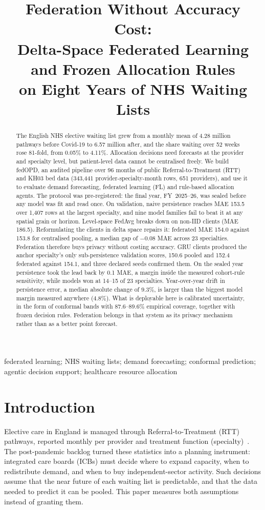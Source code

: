 \documentclass[conference]{IEEEtran}
\title{Federation Without Accuracy Cost:\\
Delta-Space Federated Learning and Frozen Allocation Rules\\
on Eight Years of NHS Waiting Lists}
\author{\IEEEauthorblockN{Nilesh Sarkar}
\IEEEauthorblockA{nileshsarkar.cs@gmail.com\\
Code, data pipeline and all stored outputs: \url{https://github.com/nileshsarkar-ai/fedOPD}}}
\begin{document}
\maketitle

\begin{abstract}
The English NHS elective waiting list grew from a monthly mean of 4.28 million pathways before
Covid-19 to 6.57 million after, and the share waiting over 52 weeks rose 81-fold, from 0.05\% to
4.11\%. Allocation decisions need forecasts at the provider and specialty level, but patient-level
data cannot be centralised freely. We build fedOPD, an audited pipeline over 96 months of public
Referral-to-Treatment (RTT) and KH03 bed data (343{,}441 provider-specialty-month rows, 651
providers), and use it to evaluate demand forecasting, federated learning (FL) and rule-based
allocation agents. The protocol was pre-registered: the final year, FY~2025--26, was sealed before
any model was fit and read once. On validation, naive persistence reaches MAE 153.5 over 1{,}407
rows at the largest specialty, and nine model families fail to beat it at any spatial grain or
horizon. Level-space FedAvg breaks down on non-IID clients (MAE 186.5). Reformulating the clients
in delta space repairs it: federated MAE 154.0 against 153.8 for centralised pooling, a median gap
of $-0.08$ MAE across 23 specialties. Federation therefore buys privacy without costing accuracy.
GRU clients produced the anchor specialty's only sub-persistence validation scores, 150.6 pooled
and 152.4 federated against 154.1, and three declared seeds confirmed them. On the sealed year
persistence took the lead back by 0.1 MAE, a margin inside the measured cohort-rule sensitivity,
while models won at 14--15 of 23 specialties. Year-over-year drift in persistence error, a median
absolute change of $9.3\%$, is larger than the biggest model margin measured anywhere ($4.8\%$).
What is deployable here is calibrated uncertainty, in the form of conformal bands with
87.6--89.6\% empirical coverage, together with frozen decision rules. Federation belongs in that
system as its privacy mechanism rather than as a better point forecast.
\end{abstract}

\begin{IEEEkeywords}
federated learning; NHS waiting lists; demand forecasting; conformal prediction; agentic decision
support; healthcare resource allocation
\end{IEEEkeywords}

\section{Introduction}
Elective care in England is managed through Referral-to-Treatment (RTT) pathways, reported monthly
per provider and treatment function (specialty)~\cite{nhsrtt}. The post-pandemic backlog turned
these statistics into a planning instrument: integrated care boards (ICBs) must decide where to
expand capacity, when to redistribute demand, and when to buy independent-sector activity. Such
decisions assume that the near future of each waiting list is predictable, and that the data needed
to predict it can be pooled. This paper measures both assumptions instead of granting them.
\end{document}
